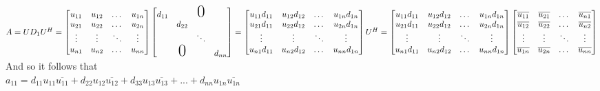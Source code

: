 \documentclass[12pt]{article}
\newenvironment{problems}{\begin{list}{}{\setlength{\labelwidth}{.7in}}}{\end{list}}
\begin{document}
\begin{problems}
$A = UD_1U^H = 
\begin{bmatrix}
u_{11} & u_{12}&\dots & u_{1n} \\
u_{21} & u_{22}&\dots & u_{2n}  \\
\vdots & \vdots &\ddots & \vdots \\
u_{n1} & u_{n2}&\dots & u_{nn}  \\
\end{bmatrix}
%
\begin{bmatrix}
d_{11} &              &\text{\huge0} &  \\
       & d_{22}       &              &  \\
       &              &\ddots        &  \\
       & \text{\huge0}&              & d_{nn}  \\
\end{bmatrix}
=
\begin{bmatrix}
u_{11}d_{11} & u_{12}d_{12}&\dots & u_{1n}d_{1n} \\
u_{21}d_{11} & u_{22}d_{12}&\dots & u_{2n}d_{1n}  \\
\vdots & \vdots &\ddots & \vdots \\
u_{n1}d_{11} & u_{n2}d_{12}&\dots & u_{nn}d_{1n}  \\
\end{bmatrix}
U^H \\
=
\begin{bmatrix}
u_{11}d_{11} & u_{12}d_{12}&\dots & u_{1n}d_{1n} \\
u_{21}d_{11} & u_{22}d_{12}&\dots & u_{2n}d_{1n}  \\
\vdots & \vdots &\ddots & \vdots \\
u_{n1}d_{11} & u_{n2}d_{12}&\dots & u_{nn}d_{1n}  \\
\end{bmatrix}
%
\begin{bmatrix}
\overline{u_{11}} & \overline{u_{21}}&\dots  & \overline{u_{n1}} \\
\overline{u_{12}} & \overline{u_{22}}&\dots  & \overline{u_{n2}}  \\
\vdots            & \vdots           &\ddots & \vdots             \\
\overline{u_{1n}} & \overline{u_{2n}}&\dots  & \overline{u_{nn}}  \\
\end{bmatrix}
$\\
And so it follows that\\
$a_{11} = d_{11}u_{11}\overline{u_{11}} + d_{22}u_{12}\overline{u_{12}} + d_{33}u_{13}\overline{u_{13}} + ... + d_{nn}u_{1n}\overline{u_{1n}}$\\


\end{problems}
\end{document}
